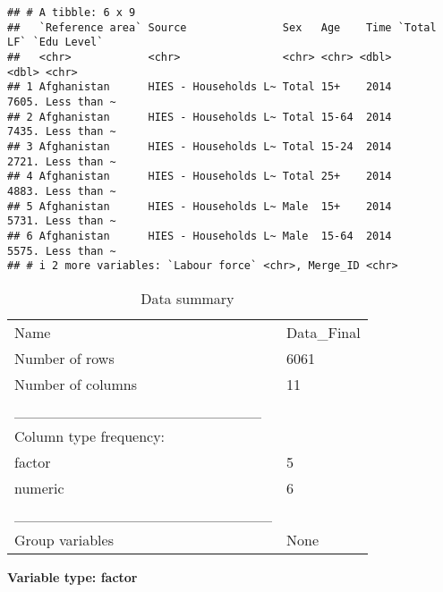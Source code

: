\documentclass[
]{article}
\begin{document}
\begin{verbatim}
## # A tibble: 6 x 9
##   `Reference area` Source               Sex   Age    Time `Total LF` `Edu Level`
##   <chr>            <chr>                <chr> <chr> <dbl>      <dbl> <chr>      
## 1 Afghanistan      HIES - Households L~ Total 15+    2014      7605. Less than ~
## 2 Afghanistan      HIES - Households L~ Total 15-64  2014      7435. Less than ~
## 3 Afghanistan      HIES - Households L~ Total 15-24  2014      2721. Less than ~
## 4 Afghanistan      HIES - Households L~ Total 25+    2014      4883. Less than ~
## 5 Afghanistan      HIES - Households L~ Male  15+    2014      5731. Less than ~
## 6 Afghanistan      HIES - Households L~ Male  15-64  2014      5575. Less than ~
## # i 2 more variables: `Labour force` <chr>, Merge_ID <chr>
\end{verbatim}

\begin{longtable}[]{@{}ll@{}}
\caption{Data summary}\tabularnewline
\toprule()
\endhead
Name & Data\_Final \\
Number of rows & 6061 \\
Number of columns & 11 \\
\_\_\_\_\_\_\_\_\_\_\_\_\_\_\_\_\_\_\_\_\_\_\_ & \\
Column type frequency: & \\
factor & 5 \\
numeric & 6 \\
\_\_\_\_\_\_\_\_\_\_\_\_\_\_\_\_\_\_\_\_\_\_\_\_ & \\
Group variables & None \\
\bottomrule()
\end{longtable}

\textbf{Variable type: factor}
\end{document}

